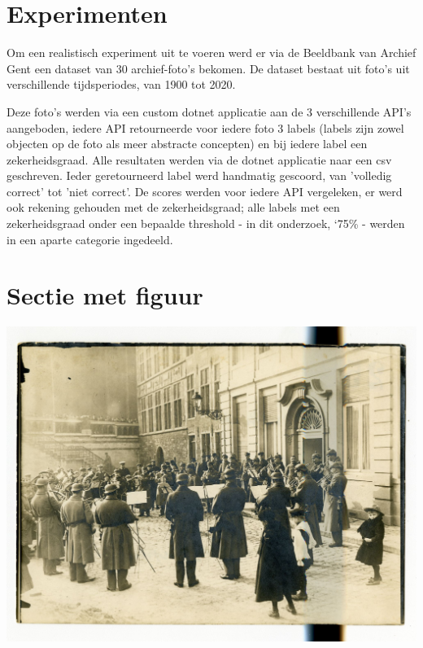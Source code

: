 \documentclass[a0,portrait]{a0poster}
\begin{document}
\begin{multicols}{2}
\color{Black} %
\color{HoGentAccent1} 
\section*{Experimenten}
\color{black}
Om een realistisch experiment uit te voeren werd er via de Beeldbank van Archief Gent een dataset van 30 archief-foto's bekomen. De dataset bestaat uit foto's uit verschillende tijdsperiodes, van 1900 tot 2020.

Deze foto's werden via een custom dotnet applicatie aan de 3 verschillende API's aangeboden, iedere API retourneerde voor iedere foto 3 labels (labels zijn zowel objecten op de foto als meer abstracte concepten) en bij iedere label een zekerheidsgraad. Alle resultaten werden via de dotnet applicatie naar een csv geschreven. Ieder geretourneerd label werd handmatig gescoord, van 'volledig correct' tot 'niet correct'. De scores werden voor iedere API vergeleken, er werd ook rekening gehouden met de zekerheidsgraad; alle labels met een zekerheidsgraad onder een bepaalde threshold - in dit onderzoek, \char`75\% -  werden in een aparte categorie ingedeeld.

\color{HoGentAccent1} 
\section*{Sectie met figuur}
\color{black}


\begin{center}\vspace{1cm}
\includegraphics[width=1.0\linewidth]{sample28}
\end{center}\vspace{1cm}


\end{multicols}
\end{document}
